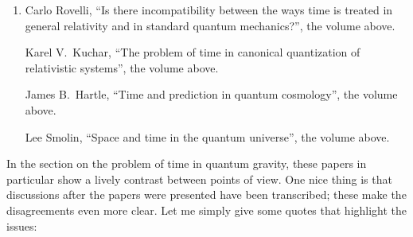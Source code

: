 \documentclass[12pt]{article}
\begin{document}
\begin{enumerate}
\def\labelenumi{\arabic{enumi})}
\setcounter{enumi}{2}
\item
  Carlo Rovelli, ``Is there incompatibility between the ways time is treated in general
  relativity and in standard quantum mechanics?'', the
  volume above.

 Karel V.\ Kuchar, ``The problem of time in canonical quantization of relativistic systems'', the volume above.

  James B.\ Hartle, ``Time and prediction in quantum cosmology'', the
  volume above.

  Lee Smolin, ``Space and time in the quantum universe'', the volume
  above.
\end{enumerate}
\noindent
In the section on the problem of time in quantum gravity, these papers
in particular show a lively contrast between points of view. One nice
thing is that discussions after the papers were presented have been
transcribed; these make the disagreements even more clear. Let me simply
give some quotes that highlight the issues:
\end{document}
